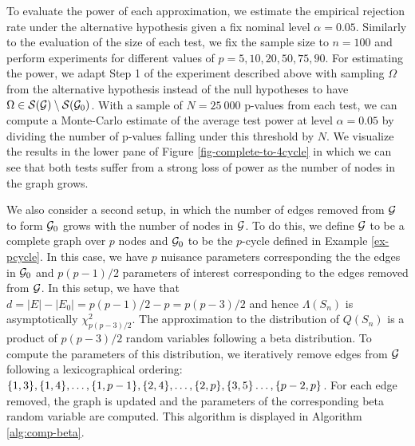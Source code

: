 To evaluate the power of each approximation, we estimate the empirical rejection rate under the alternative hypothesis given a fix nominal level $\alpha = 0.05$. Similarly to the evaluation of the size of each test, we fix the sample size to $n = 100$ and perform experiments for different values of $p = 5, 10, 20, 50, 75, 90$. For estimating the power, we adapt Step 1 of the experiment described above with sampling $\Omega$ from the alternative hypothesis instead of the null hypotheses to have $\Omega \in {\mathcal{S}}({\mathcal{G}}) \setminus {\mathcal{S}}({\mathcal{G}}_0)$. With a sample of $N = 25\ 000$ p-values from each test, we can compute a Monte-Carlo estimate of the average test power at level $\alpha = 0.05$ by dividing the number of p-values falling under this threshold by $N$. We visualize the results in the lower pane of Figure \ref{fig-complete-to-4cycle} in which we can see that both tests suffer from a strong loss of power as the number of nodes in the graph grows.


We also consider a second setup, in which the number of edges removed from ${\mathcal{G}}$ to form ${\mathcal{G}}_0$ grows with the number of nodes in ${\mathcal{G}}$. To do this, we define ${\mathcal{G}}$ to be a complete graph over $p$ nodes and ${\mathcal{G}}_0$ to be the $p$-cycle defined in Example \ref{ex-pcycle}. In this case, we have $p$ nuisance parameters corresponding the the edges in ${\mathcal{G}}_0$ and $p(p-1)/2$ parameters of interest corresponding to the edges removed from ${\mathcal{G}}$. In this setup, we have that $d = |E| - |E_0| = p(p-1)/2 - p = p(p-3)/2$ and hence $\Lambda(S_n)$ is asymptotically $\chi^2_{p(p-3)/2}$. The approximation to the distribution of $Q(S_n)$ is a product of $p(p-3)/2$ random variables following a beta distribution. To compute the parameters of this distribution, we iteratively remove edges from ${\mathcal{G}}$ following a lexicographical ordering: ${\left\{1, 3\right\}}, {\left\{1, 4\right\}}, \ldots, {\left\{1, p-1\right\}}, {\left\{2, 4\right\}}, \ldots, {\left\{2, p\right\}}, {\left\{3, 5\right\}} \ldots, {\left\{p-2, p\right\}}$. For each edge removed, the graph is updated and the parameters of the corresponding beta random variable are computed. This algorithm is displayed in Algorithm \ref{alg:comp-beta}.

